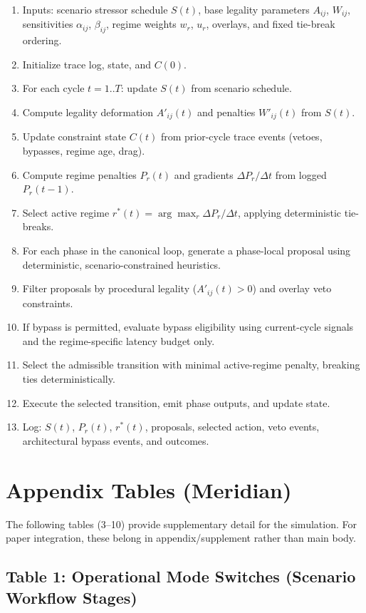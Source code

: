 \documentclass[11pt,a4paper]{article}
\begin{document}
\begin{enumerate}
    \item Inputs: scenario stressor schedule $S(t)$, base legality parameters $A_{ij}$, $W_{ij}$, sensitivities $\alpha_{ij}$, $\beta_{ij}$, regime weights $w_r$, $u_r$, overlays, and fixed tie-break ordering.
    \item Initialize trace log, state, and $C(0)$.
    \item For each cycle $t = 1..T$: update $S(t)$ from scenario schedule.
    \item Compute legality deformation $A'_{ij}(t)$ and penalties $W'_{ij}(t)$ from $S(t)$.
    \item Update constraint state $C(t)$ from prior-cycle trace events (vetoes, bypasses, regime age, drag).
    \item Compute regime penalties $P_r(t)$ and gradients $\Delta P_r/\Delta t$ from logged $P_r(t-1)$.
    \item Select active regime $r^*(t) = \arg\max_r \Delta P_r/\Delta t$, applying deterministic tie-breaks.
    \item For each phase in the canonical loop, generate a phase-local proposal using deterministic, scenario-constrained heuristics.
    \item Filter proposals by procedural legality ($A'_{ij}(t) > 0$) and overlay veto constraints.
    \item If bypass is permitted, evaluate bypass eligibility using current-cycle signals and the regime-specific latency budget only.
    \item Select the admissible transition with minimal active-regime penalty, breaking ties deterministically.
    \item Execute the selected transition, emit phase outputs, and update state.
    \item Log: $S(t)$, $P_r(t)$, $r^*(t)$, proposals, selected action, veto events, architectural bypass events, and outcomes.
\end{enumerate}

\newpage
\section{Appendix Tables (Meridian)}

The following tables (3--10) provide supplementary detail for the simulation. For paper integration, these belong in appendix/supplement rather than main body.

\subsection*{Table 1: Operational Mode Switches (Scenario Workflow Stages)}
\end{document}
